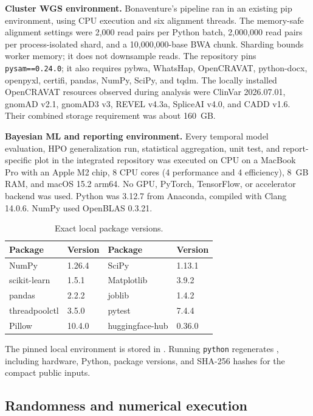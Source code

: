 \documentclass[11pt]{article}
\newcommand{\code}[1]{\texttt{#1}}
\begin{document}
\textbf{Cluster WGS environment.} Bonaventure's pipeline \citep{dossourepo2026} ran in an existing pip environment, using CPU execution and six alignment threads. The memory-safe alignment settings were 2,000 read pairs per Python batch, 2,000,000 read pairs per process-isolated shard, and a 10,000,000-base BWA chunk. Sharding bounds worker memory; it does not downsample reads. The repository pins \code{pysam==0.24.0}; it also requires pybwa, WhatsHap, OpenCRAVAT, python-docx, openpyxl, certifi, pandas, NumPy, SciPy, and tqdm. The locally installed OpenCRAVAT resources observed during analysis were ClinVar 2026.07.01, gnomAD v2.1, gnomAD3 v3, REVEL v4.3a, SpliceAI v4.0, and CADD v1.6. Their combined storage requirement was about 160~GB.



\textbf{Bayesian ML and reporting environment.} Every temporal model evaluation, HPO generalization run, statistical aggregation, unit test, and report-specific plot in the integrated repository \citep{tourerepo2026} was executed on CPU on a MacBook Pro with an Apple M2 chip, 8 CPU cores (4 performance and 4 efficiency), 8~GB RAM, and macOS 15.2 arm64. No GPU, PyTorch, TensorFlow, or accelerator backend was used. Python was 3.12.7 from Anaconda, compiled with Clang 14.0.6. NumPy used OpenBLAS 0.3.21.

\begin{table}[H]
\centering
\caption{Exact local package versions.}
\begin{tabular}{ll@{\qquad}ll}
\toprule
Package & Version & Package & Version \\
\midrule
NumPy & 1.26.4 & SciPy & 1.13.1 \\
scikit-learn & 1.5.1 & Matplotlib & 3.9.2 \\
pandas & 2.2.2 & joblib & 1.4.2 \\
threadpoolctl & 3.5.0 & pytest & 7.4.4 \\
Pillow & 10.4.0 & huggingface-hub & 0.36.0 \\
\bottomrule
\end{tabular}
\end{table}

The pinned local environment is stored in . Running \texttt{python}  regenerates , including hardware, Python, package versions, and SHA-256 hashes for the compact public inputs.

\subsection{Randomness and numerical execution}
\end{document}
